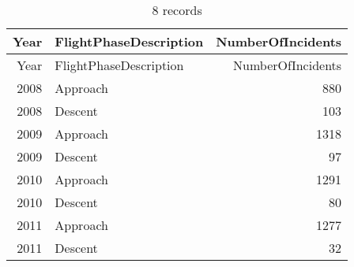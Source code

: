 \documentclass[
]{article}
\begin{document}
\begin{longtable}[]{@{}rlr@{}}
\caption{8 records}\tabularnewline
\toprule()
Year & FlightPhaseDescription & NumberOfIncidents \\
\midrule()
\endfirsthead
\toprule()
Year & FlightPhaseDescription & NumberOfIncidents \\
\midrule()
\endhead
2008 & Approach & 880 \\
2008 & Descent & 103 \\
2009 & Approach & 1318 \\
2009 & Descent & 97 \\
2010 & Approach & 1291 \\
2010 & Descent & 80 \\
2011 & Approach & 1277 \\
2011 & Descent & 32 \\
\bottomrule()
\end{longtable}
\end{document}

